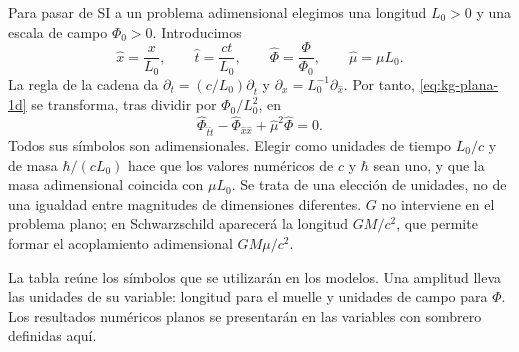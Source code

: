 Para pasar de SI a un problema adimensional elegimos una longitud
$L_0>0$ y una escala de campo $\Phi_0>0$. Introducimos
\[
\widehat x=\frac{x}{L_0},\qquad \widehat t=\frac{ct}{L_0},\qquad
\widehat\Phi=\frac{\Phi}{\Phi_0},\qquad \widehat\mu=\mu L_0.
\]
La regla de la cadena da
$\partial_t=(c/L_0)\partial_{\widehat t}$ y
$\partial_x=L_0^{-1}\partial_{\widehat x}$. Por tanto,
\eqref{eq:kg-plana-1d} se transforma, tras dividir por $\Phi_0/L_0^2$, en
\begin{equation}
\widehat\Phi_{\widehat t\widehat t}
-\widehat\Phi_{\widehat x\widehat x}
+\widehat\mu^2\widehat\Phi=0.
\label{eq:kg-adimensional}
\end{equation}
Todos sus símbolos son adimensionales. Elegir como unidades de tiempo
$L_0/c$ y de masa $\hbar/(cL_0)$ hace que los valores numéricos de $c$
y $\hbar$ sean uno, y que la masa adimensional coincida con $\mu L_0$.
Se trata de una elección de unidades, no de una igualdad entre magnitudes
de dimensiones diferentes. $G$ no interviene en el problema plano; en
Schwarzschild aparecerá la longitud $GM/c^2$, que permite formar el
acoplamiento adimensional $GM\mu/c^2$.

La tabla reúne los símbolos que se utilizarán en los modelos. Una amplitud
lleva las unidades de su variable: longitud para el muelle y unidades de
campo para $\Phi$. Los resultados numéricos planos se presentarán en las
variables con sombrero definidas aquí.

